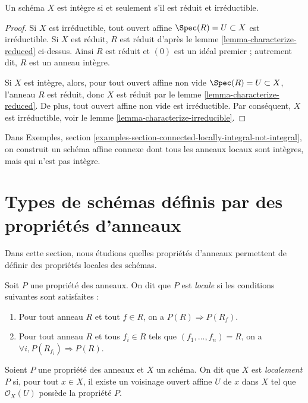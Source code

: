 \begin{lemma}
\label{lemma-characterize-integral}
Un schéma $X$ est intègre si et seulement s'il est réduit et irréductible.
\end{lemma}

\begin{proof}
Si $X$ est irréductible, tout ouvert affine $\Spec(R) = U \subset X$
est irréductible. Si $X$ est réduit, $R$ est réduit d'après le
lemme \ref{lemma-characterize-reduced} ci-dessus. Ainsi $R$ est réduit
et $(0)$ est un idéal premier ; autrement dit, $R$ est un anneau intègre.

\medskip\noindent
Si $X$ est intègre, alors, pour tout ouvert affine non vide
$\Spec(R) = U \subset X$, l'anneau $R$ est réduit,
donc $X$ est réduit par le lemme \ref{lemma-characterize-reduced}.
De plus, tout ouvert affine non vide est irréductible.
Par conséquent, $X$ est irréductible, voir le lemme \ref{lemma-characterize-irreducible}.
\end{proof}

\noindent
Dans Exemples, section
\ref{examples-section-connected-locally-integral-not-integral},
on construit un schéma affine connexe dont tous les anneaux locaux sont intègres,
mais qui n'est pas intègre.

\section{Types de schémas définis par des propriétés d'anneaux}
\label{section-properties-rings}

\noindent
Dans cette section, nous étudions quelles propriétés d'anneaux
permettent de définir des propriétés locales des schémas.

\begin{definition}
\label{definition-property-local}
Soit $P$ une propriété des anneaux.
On dit que $P$ est {\it locale} si les conditions suivantes sont satisfaites :
\begin{enumerate}
\item Pour tout anneau $R$ et tout $f \in R$, on a
$P(R) \Rightarrow P(R_f)$.
\item Pour tout anneau $R$ et tous $f_i \in R$ tels que
$(f_1, \ldots, f_n) = R$, on a
$\forall i, P(R_{f_i}) \Rightarrow P(R)$.
\end{enumerate}
\end{definition}

\begin{definition}
\label{definition-locally-P}
Soient $P$ une propriété des anneaux et $X$ un schéma.
On dit que $X$ est {\it localement $P$} si, pour tout $x \in X$,
il existe un voisinage ouvert affine $U$ de $x$
dans $X$ tel que $\mathcal{O}_X(U)$ possède la propriété $P$.
\end{definition}

